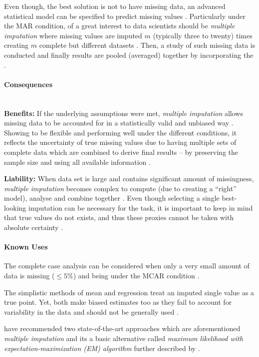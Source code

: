 Even though, the best solution is not to have missing data, an advanced statistical model can be specified to predict missing values \parencite{Hasan2017}. 
Particularly under the MAR condition, of a great interest to data scientists should be \emph{multiple imputation} where missing values are imputed $m$ (typically three to twenty) times creating $m$ complete but different datasets \parencite{Grahama2002}.
Then, a study of such missing data is conducted and finally results are pooled (averaged) together by incorporating the  \parencite[340-341]{Lynn2002}.

\paragraph*{Consequences} ~\\
{\hspace*{14.5pt} \textbf{Benefits:} \hspace*{-5.5pt} }
If the underlying assumptions were met, \emph{multiple imputation} allows missing data to be accounted for in a statistically valid and unbiased way \parencite{Hasan2017}.
Showing to be flexible and performing well under the different conditions, it reflects the uncertainty of true missing values due to having multiple sets of complete data which are combined to derive final results -- by preserving the sample size and using all available information \parencites{Lynn2002}{Grahama2002}.

\textbf{Liability:}
When data set is large and contains significant amount of missingness, \emph{multiple imputation} becomes complex to compute (due to creating a \enquote{right} model), analyse and combine together \parencite{HortonNickKen2007}.  
Even though selecting a single best-looking imputation can be necessary for the  task, it is important to keep in mind that true values do not exists, and thus these proxies cannot be taken with absolute certainty \parencite{MittagNik2013}. 

\paragraph*{Known Uses}
\begin{compactitem}
  \item The complete case analysis can be considered when only a very small amount of data is missing ($\leq 5\%$) and being under the MCAR condition \parencites{Grahama2002}{AzurMellissa2011}{imput2006}. 
  \item The simplistic methods of mean and regression treat an imputed single value as a true point. 
  Yet, both make biased estimates too as they fail to account for variability in the data and should not be generally used \parencites{Takahasi2012}{BaraldiCraig2010}.
  \item \textcites{Grahama2002}{AzurMellissa2011} have recommended two state-of-the-art approaches which are aforementioned \emph{multiple imputation} and its a basic alternative called \emph{maximum likelihood with expectation-maximization (EM) algorithm} further described by \textcites{BaraldiCraig2010}{GarcijaGomez2010}.
\end{compactitem}

